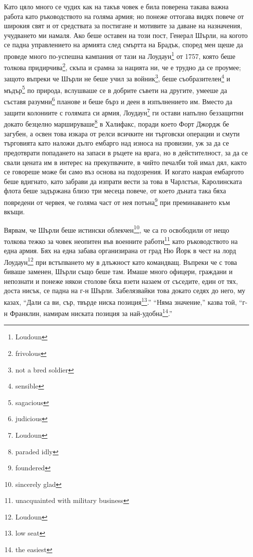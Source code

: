 \documentclass[12pt]{book}
\begin{document}
Като цяло много се чудих как на такъв човек е била поверена такава важна работа като ръководството на голяма армия; но понеже оттогава видях повече от широкия свят и от средствата за постигане и мотивите за даване на назначения, учудването ми намаля. Ако беше оставен на този пост, Генерал Шърли, на когото се падна управлението на армията след смъртта на Брадък, според мен щеше да проведе много по-успешна кампания от тази на Лоудаун\footnote{Loudoun} от 1757, която беше толкова придирчива\footnote{frivolous}, скъпа и срамна за нацията ни, че е трудно да се проумее; защото въпреки че Шърли не беше учил за войник\footnote{not a bred soldier}, беше съобразителен\footnote{sensible} и мъдър\footnote{sagacious} по природа, вслушваше се в добрите съвети на другите, умееше да съставя разумни\footnote{judicious} планове и беше бърз и деен в изпълнението им. Вместо да защити колониите с голямата си армия, Лоудаун\footnote{Loudoun} ги остави напълно беззащитни докато безцелно маршируваше\footnote{paraded idly} в Халифакс, поради което Форт Джордж бе загубен, а освен това изкара от релси всичките ни търговски операции и смути търговията като наложи дълго ембарго над износа на провизии, уж за да се предотврати попадането на запаси в ръцете на врага, но в дейстителност, за да се свали цената им в интерес на прекупвачите, в чийто печалби той имал дял, както се говореше може би само въз основа на подозрения. И когато накрая ембаргото беше вдигнато, като забрави да изпрати вести за това в Чарлстън, Каролинската флота беше задържана близо три месеца повече, от което дъната така бяха повредени от червея, че голяма част от нея потъна\footnote{foundered} при преминаването към вкъщи. 

Вярвам, че Шърли беше истински облекчен\footnote{sincerely glad}, че са го освободили от нещо толкова тежко за човек неопитен във военните работи\footnote{unacquainted with military business} като ръководството на една армия. Бях на една забава организирана от град Ню Йорк в чест на лорд Лоудаун\footnote{Loudoun} при встъпването му в длъжност като командващ. Въпреки че с това биваше заменен, Шърли също беше там. Имаше много офицери, граждани и непознати и понеже някои столове бяха взети назаем от съседите, един от тях, доста нисък, се падна на г-н Шърли. Забелязвайки това докато седях до него, му казах, “Дали са ви, сър, твърде ниска позиция\footnote{low seat}.” “Няма значение,” казва той, “г-н Франклин, намирам ниската позиция за най-удобна\footnote{the easiest}.”
\end{document}
